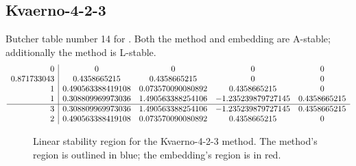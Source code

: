 \documentclass[letterpaper,10pt,english]{sphinxmanual}
\begin{document}
\subsection{Kvaerno-4-2-3}
\label{Butcher:butcher-kvaerno-4-2-3}\label{Butcher:kvaerno-4-2-3}
Butcher table number 14
for {\hyperref[c_interface/User_callable:ARKodeSetIRKTableNum]{}}.  Both the
method and embedding are A-stable; additionally the method is L-stable.
\begin{gather}
\begin{split}\begin{array}{r|cccc}
  0 & 0 & 0 & 0 & 0 \\
  0.871733043 & 0.4358665215 & 0.4358665215 & 0 & 0 \\
  1 & 0.490563388419108 & 0.073570090080892 & 0.4358665215 & 0 \\
  1 & 0.308809969973036 & 1.490563388254106 & -1.235239879727145 & 0.4358665215 \\
  \hline
  3 & 0.308809969973036 & 1.490563388254106 & -1.235239879727145 & 0.4358665215 \\
  2 & 0.490563388419108 & 0.073570090080892 & 0.4358665215 & 0
\end{array}\end{split}\notag
\end{gather}\begin{figure}[htbp]
\centering
\capstart

\caption{Linear stability region for the Kvaerno-4-2-3 method.  The method's
region is outlined in blue; the embedding's region is in red.}\end{figure}
\end{document}
